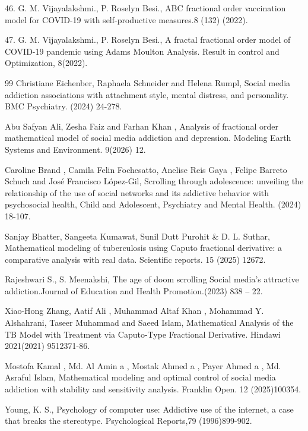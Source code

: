 \documentclass[10pt]{NSP1}
\begin{document}
	46. G. M. Vijayalakshmi., P. Roselyn Besi., ABC fractional order vaccination model for COVID-19 with self-productive measures.8 (132) (2022).
	
	47. G. M. Vijayalakshmi., P. Roselyn Besi., A fractal fractional order model of COVID-19 pandemic using Adams Moulton Analysis. Result in control and Optimization, 8(2022).
	
	\begin{thebibliography}{99}
		Christiane Eichenber, Raphaela Schneider and Helena Rumpl, Social media addiction associations with attachment style, mental distress, and personality. BMC Psychiatry. (2024) 24-278.
		
		Abu Safyan Ali, Zesha Faiz and Farhan Khan , Analysis of fractional order mathematical model of social media addiction and depression. Modeling Earth Systems and Environment. 9(2026) 12.
		
		Caroline Brand , Camila Felin Fochesatto, Anelise Reis Gaya , Felipe Barreto Schuch and José Francisco López-Gil, Scrolling through adolescence: unveiling the relationship of the use of social networks and its addictive behavior with psychosocial health, Child and Adolescent, Psychiatry and Mental Health. (2024) 18-107.
		
		Sanjay Bhatter, Sangeeta Kumawat, Sunil Dutt Purohit \& D. L. Suthar, Mathematical modeling of tuberculosis using Caputo fractional derivative: a comparative analysis with real data. Scientific reports. 15 (2025) 12672.
		
		Rajeshwari S., S. Meenakshi, The age of doom scrolling Social media's attractive addiction.Journal of Education and Health Promotion.(2023) 838 – 22.
		
		Xiao-Hong Zhang, Aatif Ali , Muhammad Altaf Khan , Mohammad Y. Alshahrani, Taseer Muhammad and Saeed Islam, Mathematical Analysis of the TB Model with Treatment via Caputo-Type Fractional Derivative. Hindawi 2021(2021) 9512371-86.
		
		Mostofa Kamal , Md. Al Amin a , Mostak Ahmed a , Payer Ahmed a , Md. Asraful Islam, Mathematical modeling and optimal control of social media addiction with stability and sensitivity analysis. Franklin Open. 12 (2025)100354.
		
		Young, K. S., Psychology of computer use: Addictive use of the internet, a case that breaks the stereotype. Psychological Reports,79 (1996)899-902.
		

\end{thebibliography}
\end{document}
